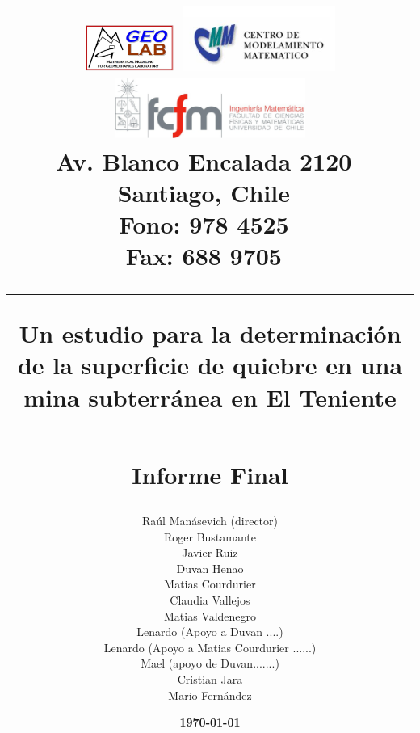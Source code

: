 \title{
\vskip -2cm
\includegraphics[height=1.5cm]{portada/figuras/logo_mmgeo}\hspace*{1.2cm}
\includegraphics[width=5cm]{./portada/figuras/logo_cmm} \hfill
\includegraphics[height=2cm]{./portada//figuras/logo_dim}\\
{\small Av. Blanco Encalada 2120 \hfill  \, \\
Santiago, Chile \hfill \, \\
Fono: 978 4525  \hfill \, \\
Fax: 688 9705  \hfill \, \\ }	
	\vspace{0.5in}
	\vspace{0.2in}
	\hrule
	\vspace{0.2in}
	\Huge Un estudio para la determinaci\'on de la superficie de quiebre en una mina subterr\'anea en El Teniente
	\vspace{0.2in}
	\hrule
	\vspace{0.2in}
	\LARGE Informe Final
}

\author{
	\large Ra\'ul Man\'asevich  (director)\\	
    \large Roger Bustamante\\
    \large Javier Ruiz\\
    \large Duvan Henao\\    
    \large Matias Courdurier\\
    \large Claudia Vallejos \\
    \large Matias Valdenegro \\
    \large Lenardo (Apoyo a Duvan ....) \\
    \large Lenardo (Apoyo a Matias Courdurier ......) \\
    \large Mael (apoyo de Duvan.......) \\    
    \large Cristian Jara\\
	\large Mario Fern\'andez\\
}

\date{\large\textbf{\today}}
